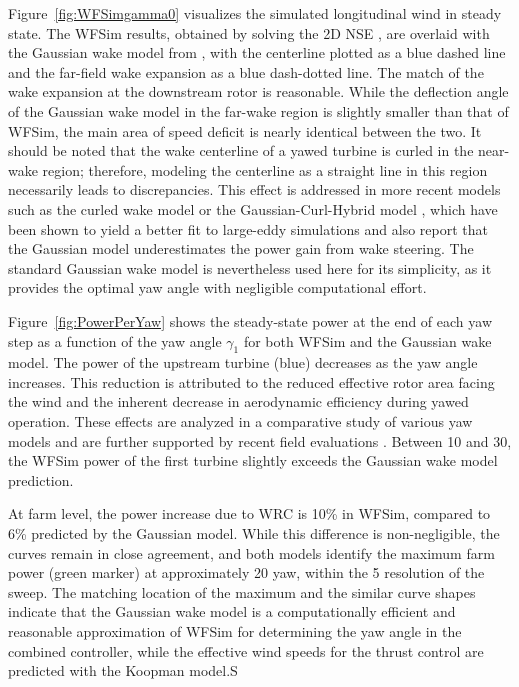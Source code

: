 Figure~\ref{fig:WFSimgamma0} visualizes the simulated longitudinal wind in steady state. The WFSim results, obtained by solving the 2D NSE \cite{boersma2018control}, are overlaid with the Gaussian wake model from \cite{bastankhah2016experimental}, with the centerline plotted as a blue dashed line and the far-field wake expansion as a blue dash-dotted line. The match of the wake expansion at the downstream rotor is reasonable. While the deflection angle of the Gaussian wake model in the far-wake region is slightly smaller than that of WFSim, the main area of speed deficit is nearly identical between the two. It should be noted that the wake centerline of a yawed turbine is curled in the near-wake region; therefore, modeling the centerline as a straight line in this region necessarily leads to discrepancies. This effect is addressed in more recent models such as the curled wake model \cite{martinez2019aerodynamics} or the Gaussian-Curl-Hybrid model \cite{king2020controls}, which have been shown to yield a better fit to large-eddy simulations and also report that the Gaussian model underestimates the power gain from wake steering. The standard Gaussian wake model is nevertheless used here for its simplicity, as it provides the optimal yaw angle with negligible computational effort.

Figure~\ref{fig:PowerPerYaw} shows the steady-state power at the end of each yaw step as a function of the yaw angle $\gamma_1$ for both WFSim and the Gaussian wake model. The power of the upstream turbine (blue) decreases as the yaw angle increases. This reduction is attributed to the reduced effective rotor area facing the wind and the inherent decrease in aerodynamic efficiency during yawed operation. These effects are analyzed in a comparative study of various yaw models \cite{sant2016comparing} and are further supported by recent field evaluations \cite{hulsman2022turbine}. Between 10\textdegree{} and 30\textdegree{}, the WFSim power of the first turbine slightly exceeds the Gaussian wake model prediction.

At farm level, the power increase due to WRC is 10\% in WFSim, compared to 6\% predicted by the Gaussian model. While this difference is non-negligible, the curves remain in close agreement, and both models identify the maximum farm power (green marker) at approximately 20\textdegree{} yaw, within the 5\textdegree{} resolution of the sweep. The matching location of the maximum and the similar curve shapes indicate that the Gaussian wake model is a computationally efficient and reasonable approximation of WFSim for determining the yaw angle in the combined controller, while the effective wind speeds for the thrust control are predicted with the Koopman model.S

